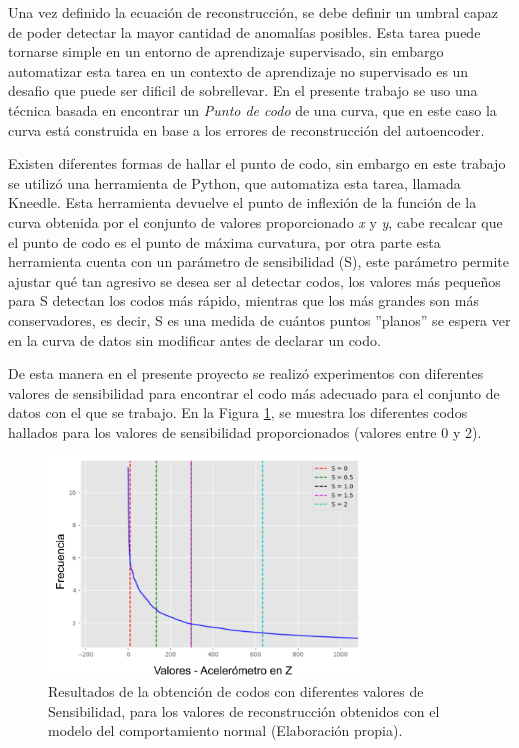 Una vez definido la ecuaci\'{o}n de reconstrucci\'{o}n, se debe definir un umbral capaz de poder detectar la mayor cantidad de anomal\'{i}as posibles. Esta tarea puede tornarse simple en un entorno de aprendizaje supervisado, sin embargo automatizar esta tarea en un contexto de aprendizaje no supervisado es un desafio que puede ser dificil de sobrellevar. En el presente trabajo se uso una t\'{e}cnica basada en encontrar un \textit{Punto de codo} de una curva, que en este caso la curva est\'{a} construida en base a los errores de reconstrucci\'{o}n del autoencoder.

\vspace{5mm} %

Existen diferentes formas de hallar el punto de codo, sin embargo en este trabajo se utiliz\'{o} una herramienta de Python, que automatiza esta tarea, llamada Kneedle. Esta herramienta devuelve el punto de inflexi\'{o}n de la funci\'{o}n de la curva obtenida por el conjunto de valores proporcionado \textit{x} y \textit{y}, cabe recalcar que el punto de codo es el punto de m\'{a}xima curvatura, por otra parte esta herramienta cuenta con un par\'{a}metro de sensibilidad (S), este par\'{a}metro permite ajustar qu\'{e} tan agresivo se desea ser al detectar codos, los valores m\'{a}s peque\~{n}os para S detectan los codos m\'{a}s r\'{a}pido, mientras que los m\'{a}s grandes son m\'{a}s conservadores, es decir, S es una medida de cu\'{a}ntos puntos ''planos'' se espera ver en la curva de datos sin modificar antes de declarar un codo.

\vspace{5mm} %

De esta manera en el presente proyecto se realiz\'{o} experimentos con diferentes valores de sensibilidad para encontrar el codo m\'{a}s adecuado para el conjunto de datos con el que se trabajo. En la Figura \ref{fig:zoom_codos}, se muestra los diferentes codos hallados para los valores de sensibilidad proporcionados (valores entre 0 y 2).

\begin{figure}[H]
        \centering
            \includegraphics[width=0.75\textwidth, frame]{imagenes/Cap5/zoom_codos}
        \caption{Resultados de la obtenci\'{o}n de codos con diferentes valores de Sensibilidad, para los valores de reconstrucci\'{o}n obtenidos con el modelo del comportamiento normal (Elaboraci\'{o}n propia).}
		\label{fig:zoom_codos}
\end{figure}

